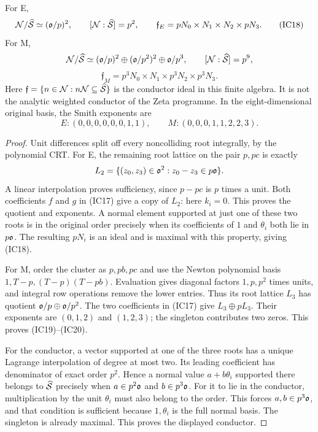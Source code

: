 \begin{theorem}\label{thm:index}
For E,
\[
 \mathcal N/\widehat{\mathcal S}\simeq(\mathfrak o/p)^2,
 \qquad[\mathcal N:\widehat{\mathcal S}]=p^2,
 \qquad\mathfrak f_E=pN_0\times N_1\times N_2\times pN_3.       \tag{IC18}
\]
For M,
\[
 \mathcal N/\widehat{\mathcal S}\simeq(\mathfrak o/p)^2\oplus(\mathfrak o/p^2)^2\oplus\mathfrak o/p^3,
 \qquad[\mathcal N:\widehat{\mathcal S}]=p^9,
\]
\[
 \mathfrak f_M=p^3N_0\times N_1\times p^3N_2\times p^3N_3.      \tag{IC19}
\]
Here $\mathfrak f=\{n\in\mathcal N:n\mathcal N\subseteq\widehat{\mathcal S}\}$ is the conductor ideal in
this finite algebra. It is not the analytic weighted conductor of the Zeta
programme. In the eight-dimensional original basis, the Smith exponents are
\[
 E:(0,0,0,0,0,0,1,1),\qquad
 M:(0,0,0,1,1,2,2,3).                                   \tag{IC20}
\]
\end{theorem}
\begin{proof}
Unit differences split off every noncolliding root integrally, by the polynomial
CRT. For E, the remaining root lattice on the pair $p,pc$ is exactly
\[
 L_2=\{(z_0,z_3)\in\mathfrak o^2:z_0-z_3\in p\mathfrak o\}.
\]
A linear interpolation proves sufficiency, since $p-pc$ is $p$ times a unit.
Both coefficients $f$ and $g$ in (IC17) give a copy of $L_2$: here $k_i=0$.
This proves the quotient and exponents. A normal element supported at just one
of these two roots is in the original order precisely when its coefficients
of $1$ and $\theta_i$ both lie in $p\mathfrak o$. The resulting $pN_i$ is an ideal and
is maximal with this property, giving (IC18).

For M, order the cluster as $p,pb,pc$ and use the Newton polynomial basis
$1,T-p,(T-p)(T-pb)$. Evaluation gives diagonal factors $1,p,p^2$ times units,
and integral row operations remove the lower entries. Thus its root lattice
$L_3$ has quotient $\mathfrak o/p\oplus\mathfrak o/p^2$. The two coefficients in (IC17)
give $L_3\oplus pL_3$. Their exponents are $(0,1,2)$ and $(1,2,3)$; the
singleton contributes two zeros. This proves (IC19)--(IC20).

For the conductor, a vector supported at one of the three roots has a unique
Lagrange interpolation of degree at most two. Its leading coefficient has
denominator of exact order $p^2$. Hence a normal value $a+b\theta_i$ supported
there belongs to $\widehat{\mathcal S}$ precisely when $a\in p^2\mathfrak o$ and $b\in p^3\mathfrak o$.
For it to lie in the conductor, multiplication by the unit $\theta_i$ must also
belong to the order. This forces $a,b\in p^3\mathfrak o$, and that condition is
sufficient because $1,\theta_i$ is the full normal basis. The singleton is
already maximal. This proves the displayed conductor.
\end{proof}

